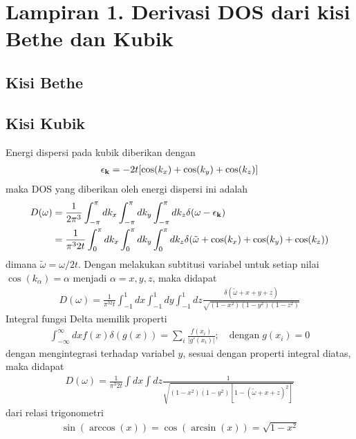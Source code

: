 \chapter*{Lampiran 1. Derivasi DOS dari kisi Bethe dan Kubik}

\section*{Kisi Bethe}

\section*{Kisi Kubik}

Energi dispersi pada kubik diberikan dengan
\begin{align}
\epsilon_{\textbf{k}} = -2t[\cos(k_x) + \cos(k_y) + \cos(k_z)]
\end{align}
maka DOS yang diberikan oleh energi dispersi ini adalah
\begin{align}
D(\omega	) &= \frac{1}{2\pi^3} \int_{-\pi}^\pi dk_x \int_{-\pi}^\pi dk_y \int_{-\pi}^\pi dk_z \delta(\omega - \epsilon_{\textbf{k}})\\
&= \frac{1}{\pi^3 2t}\int_0^\pi dk_x \int_0^\pi dk_y \int_0^\pi dk_z  \delta(\tilde{\omega} + \cos(k_x) + \cos(k_y) + \cos(k_z))
\end{align}
dimana $\tilde{\omega} = \omega / 2t$. Dengan melakukan subtitusi variabel untuk setiap nilai $\cos(k_\alpha) = \alpha$ menjadi $\alpha = x,y,z$, maka didapat
\begin{align}
D(\omega) = \frac{1}{\pi^32t}\int_{-1}^{1} dx \int_{-1}^{1} dy \int_{-1}^{1} dz \frac{\delta(\tilde{\omega} + x + y + z)}{\sqrt{(1-x^2)(1-y^2)(1-z^2)}}
\end{align}
Integral fungsi Delta memilik properti
\begin{align}
\int_{-\infty}^\infty dx f(x) \delta(g(x)) = \sum_i \frac{f(x_i)}{\vert g'(x_i) \vert}; \quad \text{dengan} \; g(x_i) = 0
\end{align}
dengan mengintegrasi terhadap variabel $y$, sesuai dengan properti integral diatas, maka didapat
\begin{align}
D(\omega) = \frac{1}{\pi^3 2t}\int dx \int dz \frac{1}{\sqrt{(1-x^2)(1-y^2)[1-(\tilde{\omega} + x + z)^2]}}
\end{align}
dari relasi trigonometri
\begin{align}
\sin(\arccos(x)) = \cos(\arcsin(x)) = \sqrt{1 - x^2}
\end{align}
